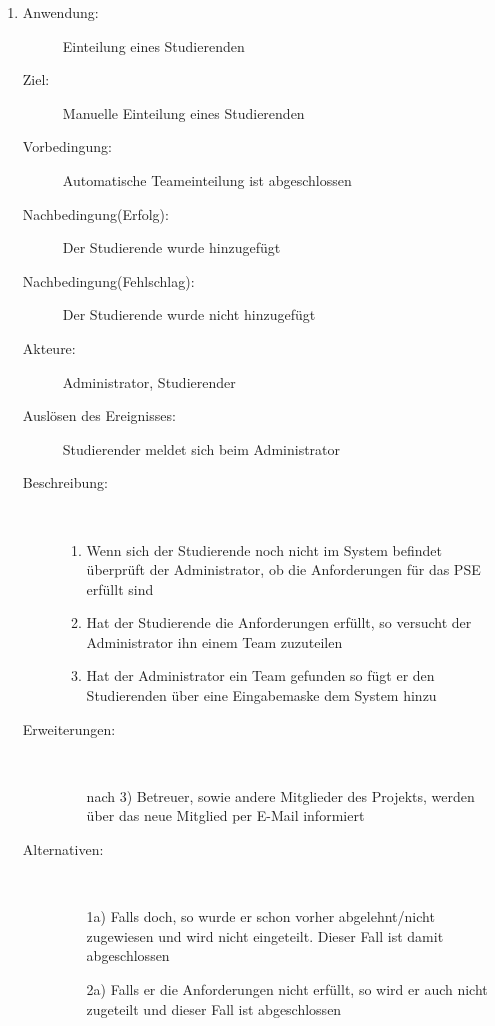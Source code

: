 \documentclass[parskip=full]{scrartcl}
\newcommand{\swtLabel}[1]{\textbf{/#1\arabic*0/}}
\begin{document}
\begin{enumerate} [label=\swtLabel{A}]
  
  \item
  \begin{description}
  \item[Anwendung:] Einteilung eines Studierenden
  \item[Ziel:] Manuelle Einteilung eines Studierenden
  	\item[Vorbedingung:] Automatische Teameinteilung ist abgeschlossen
  	\item[Nachbedingung(Erfolg):] Der Studierende wurde hinzugefügt
  	\item[Nachbedingung(Fehlschlag):] Der Studierende wurde nicht hinzugefügt
  	\item[Akteure:] Administrator, Studierender
  	\item[Auslösen des Ereignisses:] Studierender meldet sich beim Administrator
  	\item[Beschreibung:]~
  	 \begin{enumerate} 
  	   \item Wenn sich der Studierende noch nicht im System befindet überprüft der
  	   Administrator, ob die Anforderungen für das PSE erfüllt sind
  	   \item Hat der Studierende die Anforderungen erfüllt, so versucht der
  	   Administrator ihn einem Team zuzuteilen
  	   \item Hat der Administrator ein Team gefunden so fügt er den Studierenden
  	   über eine Eingabemaske dem System hinzu
  	 \end{enumerate}
  	\item[Erweiterungen:]~
  	 \begin{enumerate}
  	   \item [nach 3)] Betreuer, sowie andere Mitglieder des Projekts, werden
  	   über das neue Mitglied per E-Mail informiert 
  	 \end{enumerate}  
  	\item[Alternativen:] ~
  	 \begin{enumerate}
  	  \item[1a)] Falls doch, so wurde er schon vorher abgelehnt/nicht zugewiesen
  	  und wird nicht eingeteilt. Dieser Fall ist damit abgeschlossen
  	  \item [2a)] Falls er die Anforderungen nicht erfüllt, so wird er auch nicht
  	  zugeteilt und dieser Fall ist abgeschlossen
  	 \end{enumerate}  
  \end{description}
   

\end{enumerate}
\end{document}
